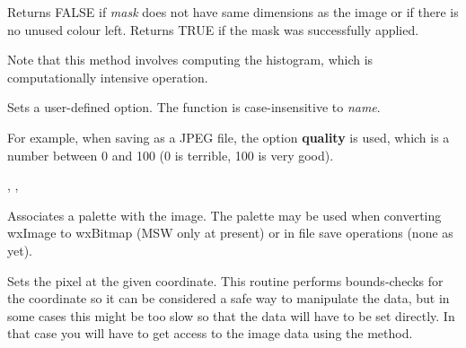 
Returns FALSE if {\it mask} does not have same dimensions as the image or if
there is no unused colour left. Returns TRUE if the mask was successfully 
applied.


Note that this method involves computing the histogram, which is
computationally intensive operation.

\label{wximagesetoption}



Sets a user-defined option. The function is case-insensitive to {\it name}.

For example, when saving as a JPEG file, the option {\bf quality} is
used, which is a number between 0 and 100 (0 is terrible, 100 is very good).


,\rtfsp
{},\rtfsp
{}

\label{wximagesetpalette}


Associates a palette with the image. The palette may be used when converting
wxImage to wxBitmap (MSW only at present) or in file save operations (none as yet).

\label{wximagesetrgb}


Sets the pixel at the given coordinate. This routine performs bounds-checks
for the coordinate so it can be considered a safe way to manipulate the
data, but in some cases this might be too slow so that the data will have to
be set directly. In that case you will have to get access to the image data 
using the  method.



